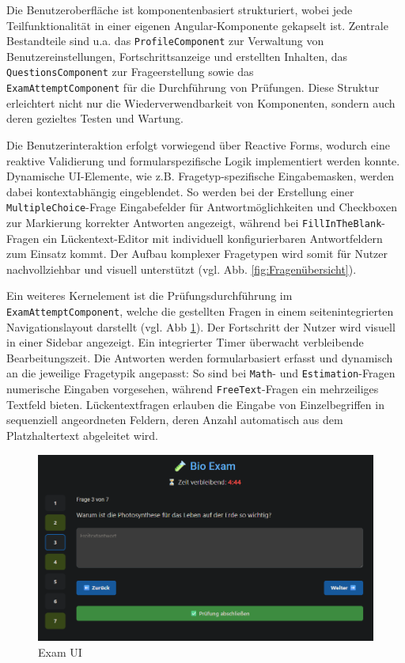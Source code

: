 \documentclass[a4paper,12pt]{article}
\begin{document}
Die Benutzeroberfläche ist komponentenbasiert strukturiert, wobei jede Teilfunktionalität in einer eigenen Angular-Komponente gekapselt ist. Zentrale Bestandteile sind u.a. das 	\texttt{ProfileComponent} zur Verwaltung von Benutzereinstellungen, Fortschrittsanzeige und erstellten Inhalten, das \texttt{QuestionsComponent} zur Frageerstellung sowie das \\	\texttt{ExamAttemptComponent} für die Durchführung von Prüfungen. Diese Struktur erleichtert nicht nur die Wiederverwendbarkeit von Komponenten, sondern auch deren gezieltes Testen und Wartung.

Die Benutzerinteraktion erfolgt vorwiegend über Reactive Forms, wodurch eine reaktive Validierung und formularspezifische Logik implementiert werden konnte. Dynamische UI-Elemente, wie z.B. Fragetyp-spezifische Eingabemasken, werden dabei kontextabhängig eingeblendet. So werden bei der Erstellung einer 	\texttt{MultipleChoice}-Frage Eingabefelder für Antwortmöglichkeiten und Checkboxen zur Markierung korrekter Antworten angezeigt, während bei 	\texttt{FillInTheBlank}-Fragen ein Lückentext-Editor mit individuell konfigurierbaren Antwortfeldern zum Einsatz kommt. Der Aufbau komplexer Fragetypen wird somit für Nutzer nachvollziehbar und visuell unterstützt (vgl. Abb. \ref{fig:Fragenübersicht}).

Ein weiteres Kernelement ist die Prüfungsdurchführung im 	\texttt{ExamAttemptComponent}, welche die gestellten Fragen in einem seitenintegrierten Navigationslayout darstellt (vgl. Abb \ref{fig:exam}). Der Fortschritt der Nutzer wird visuell in einer Sidebar angezeigt. Ein integrierter Timer überwacht verbleibende Bearbeitungszeit. Die Antworten werden formularbasiert erfasst und dynamisch an die jeweilige Fragetypik angepasst: So sind bei 	\texttt{Math}- und 	\texttt{Estimation}-Fragen numerische Eingaben vorgesehen, während 	\texttt{FreeText}-Fragen ein mehrzeiliges Textfeld bieten. Lückentextfragen erlauben die Eingabe von Einzelbegriffen in sequenziell angeordneten Feldern, deren Anzahl automatisch aus dem Platzhaltertext abgeleitet wird.

\begin{figure}[H]
    \centering
    \includegraphics[width=1\textwidth]{Bilder/Exam.png}
    \caption{Exam UI}
    \label{fig:exam}
\end{figure}
\end{document}
